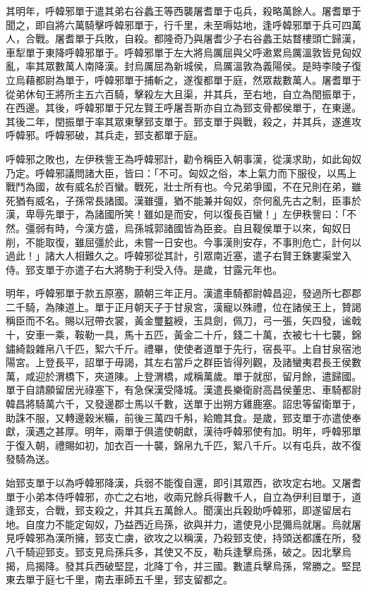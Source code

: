 \begin{pinyinscope}
其明年，呼韓邪單于遣其弟右谷蠡王等西襲屠耆單于屯兵，殺略萬餘人。屠耆單于聞之，即自將六萬騎擊呼韓邪單于，行千里，未至嗕姑地，逢呼韓邪單于兵可四萬人，合戰。屠耆單于兵敗，自殺。都隆奇乃與屠耆少子右谷蠡王姑瞀樓頭亡歸漢，車犁單于東降呼韓邪單于。呼韓邪單于左大將烏厲屈與父呼遫累烏厲溫敦皆見匈奴亂，率其眾數萬人南降漢。封烏厲屈為新城侯，烏厲溫敦為義陽侯。是時李陵子復立烏藉都尉為單于，呼韓邪單于捕斬之，遂復都單于庭，然眾裁數萬人。屠耆單于從弟休旬王將所主五六百騎，擊殺左大且渠，并其兵，至右地，自立為閏振單于，在西邊。其後，呼韓邪單于兄左賢王呼屠吾斯亦自立為郅支骨都侯單于，在東邊。其後二年，閏振單于率其眾東擊郅支單于。郅支單于與戰，殺之，并其兵，遂進攻呼韓邪。呼韓邪破，其兵走，郅支都單于庭。

呼韓邪之敗也，左伊秩訾王為呼韓邪計，勸令稱臣入朝事漢，從漢求助，如此匈奴乃定。呼韓邪議問諸大臣，皆曰：「不可。匈奴之俗，本上氣力而下服役，以馬上戰鬥為國，故有威名於百蠻。戰死，壯士所有也。今兄弟爭國，不在兄則在弟，雖死猶有威名，子孫常長諸國。漢雖彊，猶不能兼并匈奴，奈何亂先古之制，臣事於漢，卑辱先單于，為諸國所笑！雖如是而安，何以復長百蠻！」左伊秩訾曰：「不然。彊弱有時，今漢方盛，烏孫城郭諸國皆為臣妾。自且鞮侯單于以來，匈奴日削，不能取復，雖屈彊於此，未嘗一日安也。今事漢則安存，不事則危亡，計何以過此！」諸大人相難久之。呼韓邪從其計，引眾南近塞，遣子右賢王銖婁渠堂入侍。郅支單于亦遣子右大將駒于利受入侍。是歲，甘露元年也。

明年，呼韓邪單于款五原塞，願朝三年正月。漢遣車騎都尉韓昌迎，發過所七郡郡二千騎，為陳道上。單于正月朝天子于甘泉宮，漢寵以殊禮，位在諸侯王上，贊謁稱臣而不名。賜以冠帶衣裳，黃金璽盭綬，玉具劍，佩刀，弓一張，矢四發，谧戟十，安車一乘，鞍勒一具，馬十五匹，黃金二十斤，錢二十萬，衣被七十七襲，錦鏽綺縠雜帛八千匹，絮六千斤。禮畢，使使者道單于先行，宿長平。上自甘泉宿池陽宮。上登長平，詔單于毋謁，其左右當戶之群臣皆得列觀，及諸蠻夷君長王侯數萬，咸迎於渭橋下，夾道陳。上登渭橋，咸稱萬歲。單于就邸，留月餘，遣歸國。單于自請願留居光祿塞下，有急保漢受降城。漢遣長樂衛尉高昌侯董忠、車騎都尉韓昌將騎萬六千，又發邊郡士馬以千數，送單于出朔方雞鹿塞。詔忠等留衛單于，助誅不服，又轉邊穀米糒，前後三萬四千斛，給贍其食。是歲，郅支單于亦遣使奉獻，漢遇之甚厚。明年，兩單于俱遣使朝獻，漢待呼韓邪使有加。明年，呼韓邪單于復入朝，禮賜如初，加衣百一十襲，錦帛九千匹，絮八千斤。以有屯兵，故不復發騎為送。

始郅支單于以為呼韓邪降漢，兵弱不能復自還，即引其眾西，欲攻定右地。又屠耆單于小弟本侍呼韓邪，亦亡之右地，收兩兄餘兵得數千人，自立為伊利目單于，道逢郅支，合戰，郅支殺之，并其兵五萬餘人。聞漢出兵穀助呼韓邪，即遂留居右地。自度力不能定匈奴，乃益西近烏孫，欲與并力，遣使見小昆彌烏就屠。烏就屠見呼韓邪為漢所擁，郅支亡虜，欲攻之以稱漢，乃殺郅支使，持頭送都護在所，發八千騎迎郅支。郅支見烏孫兵多，其使又不反，勒兵逢擊烏孫，破之。因北擊烏揭，烏揭降。發其兵西破堅昆，北降丁令，并三國。數遣兵擊烏孫，常勝之。堅昆東去單于庭七千里，南去車師五千里，郅支留都之。


\end{pinyinscope}
